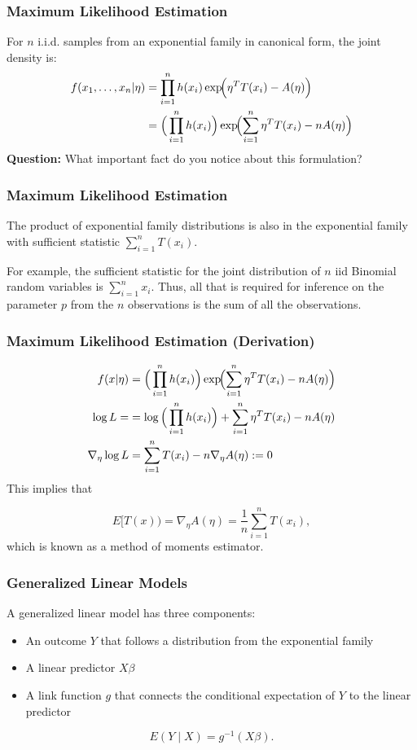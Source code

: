 \documentclass{beamer}
\begin{document}
\begin{frame}
\frametitle{Maximum Likelihood Estimation}
For $n$ i.i.d. samples from an exponential family in canonical form, the joint density is:
\begin{align}
f(x_1,\dots,x_n|\eta) &= \prod_{i=1}^n h(x_i) \exp\!\Bigl(\eta^T T(x_i) - A(\eta)\Bigr) \\
&= \Big(
\prod_{i=1}^n h(x_i)
\Big)
\exp\!\Bigl(\sum_{i=1}^n \eta^T T(x_i) - nA(\eta)\Bigr) 
\end{align}
\textbf{Question:} What important fact do you notice about this formulation?
\end{frame}

\begin{frame}
\frametitle{Maximum Likelihood Estimation}
The product of exponential family distributions is also in the exponential family with sufficient statistic $\sum_{i=1}^n T(x_i).$

\vspace*{1em}

For example, the sufficient statistic for the joint distribution of $n$ iid Binomial random variables is $\sum_{i=1}^n x_i.$ Thus, all that is required for inference on the parameter $p$ from the $n$ observations is the sum of all the observations. 
\end{frame}

\begin{frame}
\frametitle{Maximum Likelihood Estimation (Derivation)}
\begin{align}
f(x|\eta)  &= \Big(
\prod_{i=1}^n h(x_i)
\Big) \exp\!\Bigl(\sum_{i=1}^n \eta^T T(x_i) - nA(\eta)\Bigr) \\
\log L = &=  \log \Big(
\prod_{i=1}^n h(x_i)
\Big) 
+ \sum_{i=1}^n \eta^T T(x_i) - nA(\eta)\\
\nabla_{\eta} \log L &= \sum_{i=1}^n T(x_i) - n \nabla_{\eta} A(\eta) :=0
\end{align}
This implies that 

$$E[T(x)) =  \nabla_{\eta} A(\eta) = \frac{1}{n} \sum_{i=1}^n T(x_i),$$
which is known as a method of moments estimator. 

\end{frame}

\begin{frame}
\frametitle{Generalized Linear Models}

A generalized linear model has three components:

\begin{itemize}
\item An outcome $Y$ that follows a distribution from the
exponential family
\item A linear predictor $X \beta$
\item A link function $g$ that connects the conditional expectation of $Y$ to the linear predictor
\end{itemize}
$$E(Y \mid X) = g^{-1}(X \beta).$$

\end{frame}
\end{document}
